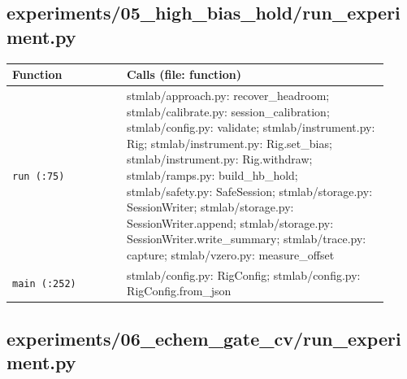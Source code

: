 \subsection{experiments/05\_high\_bias\_hold/run\_experiment.py}

\small\setlength{\LTleft}{0pt}\setlength{\LTright}{\fill}
\begin{longtable}{@{}>{\raggedright\arraybackslash}p{0.280\linewidth}>{\raggedright\arraybackslash}p{0.640\linewidth}@{}}
\toprule
\textbf{Function} & \textbf{Calls (file: function)} \\
\midrule\endhead
\texttt{run (:75)} & stmlab/approach.py: recover\_headroom; stmlab/calibrate.py: session\_calibration; stmlab/config.py: validate; stmlab/instrument.py: Rig; stmlab/instrument.py: Rig.set\_bias; stmlab/instrument.py: Rig.withdraw; stmlab/ramps.py: build\_hb\_hold; stmlab/safety.py: SafeSession; stmlab/storage.py: SessionWriter; stmlab/storage.py: SessionWriter.append; stmlab/storage.py: SessionWriter.write\_summary; stmlab/trace.py: capture; stmlab/vzero.py: measure\_offset \\
\texttt{main (:252)} & stmlab/config.py: RigConfig; stmlab/config.py: RigConfig.from\_json \\
\bottomrule
\end{longtable}
\normalsize

\subsection{experiments/06\_echem\_gate\_cv/run\_experiment.py}

